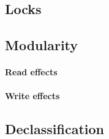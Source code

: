
\subsection{Locks}


\subsection{Modularity}

\paragraph{Read effects}

\paragraph{Write effects}

\subsection{Declassification}

